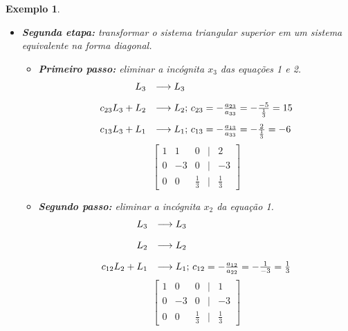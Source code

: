 \documentclass[12pt,a4paper]{book}
\newtheorem{example}{Exemplo}
\numberwithin{example}{chapter}
\numberwithin{remark}{chapter}
\numberwithin{definition}{chapter}
\begin{document}
\begin{example}
\begin{itemize}
        \item \textbf{Segunda etapa: } transformar o sistema triangular superior em um sistema equivalente na forma diagonal.

        \begin{itemize}
            \item \textbf{Primeiro passo: } eliminar a incógnita $x_3$ das equações 1 e 2.
            $$
            	\begin{array}{r l}
	                L_3 & \longrightarrow L_3\\[10pt]
                	c_{23}L_3 + L_2 & \longrightarrow L_2\text{; } c_{23}=-\frac{a_{23}}{a_{33}}=-\frac{-5}{\frac{1}{3}}=15\\[10pt]
            	    c_{13}L_3+L_1 & \longrightarrow L_1\text{; } c_{13}=-\frac{a_{13}}{a_{33}}=-\frac{2}{\frac{1}{3}}=-6
                \end{array}
            $$
            $$
	            \begin{bmatrix}
                	1 & 1 & 0 &|& 2\\
	                0 & -3 & 0 &|& -3\\
        	        0 & 0 & \frac{1}{3} &|& \frac{1}{3}
        	    \end{bmatrix}
	        $$

            \item \textbf{Segundo passo: } eliminar a incógnita $x_2$ da equação 1.
            $$
            	\begin{array}{r l}
	                L_3 & \longrightarrow L_3\\[10pt]
                	L_2 & \longrightarrow L_2\\[10pt]
            	    c_{12}L_2+L_1 & \longrightarrow L_1\text{; } c_{12}=-\frac{a_{12}}{a_{22}}=-\frac{1}{-3}=\frac{1}{3}
                \end{array}
            $$
            $$
	            \begin{bmatrix}
                	1 & 0 & 0 &|& 1\\
	                0 & -3 & 0 &|& -3\\
        	        0 & 0 & \frac{1}{3} &|& \frac{1}{3}
        	    \end{bmatrix}
	        $$
        \end{itemize}


\end{itemize}
\end{example}
\end{document}
